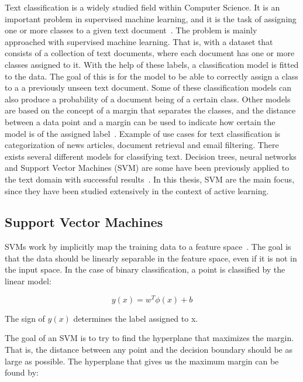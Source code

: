 Text classification is a widely studied field within Computer Science.
It is an important problem in supervised machine learning, and it is the task of assigning one or more classes to a given text document~\cite{aggarwal2012surveyclass}.
The problem is mainly approached with supervised machine learning.
That is, with a dataset that consists of a collection of text documents, where each document has one or more classes assigned to it. %
With the help of these labels, a classification model is fitted to the data.
The goal of this is for the model to be able to correctly assign a class to a a previously unseen text document.
Some of these classification models can also produce a probability of a document being of a certain class.
Other models are based on the concept of a margin that separates the classes, and the distance between a data point and a margin can be used to indicate how certain the model is of the assigned label~\cite{tong2001support}.
Example of use cases for text classification is categorization of news articles, document retrieval and email filtering.
There exists several different models for classifying text.
Decision trees, neural networks and Support Vector Machines (SVM) are some have been previously applied to the text domain with successful results~\cite{aggarwal2012survey}.
In this thesis, SVM are the main focus, since they have been studied extensively in the context of active learning. %

\subsection{Support Vector Machines}


SVMs work by implicitly map the training data to a feature space~\cite{bishop2006pattern}.
The goal is that the data should be linearly separable in the feature space, even if it is not in the input space.
In the case of binary classification, a point is classified by the linear model:

\begin{equation}
    y(x) = w^T \phi(x) + b
\end{equation}

The sign of $y(x)$ determines the label assigned to x.

The goal of an SVM is to try to find the hyperplane that maximizes the margin.
That is, the distance between any point and the decision boundary should be as large as possible.
The hyperplane that gives us the maximum margin can be found by:

